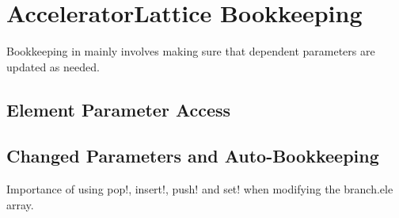 \chapter{AcceleratorLattice Bookkeeping}
\label{c:bookkeeping}

Bookkeeping in \accellat mainly involves making sure that dependent parameters are updated as needed.

\section{Element Parameter Access}
\label{s:access}

\section{Changed Parameters and Auto-Bookkeeping}
\label{s:changed.param}

Importance of using pop!, insert!, push! and set! when modifying the branch.ele array.